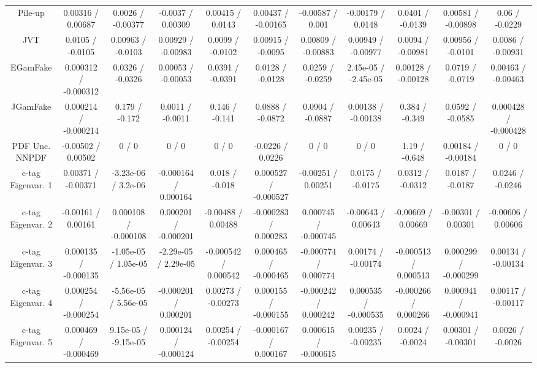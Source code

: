 \begin{table}[htbp]
\begin{center}
\begin{tabular}{|c|c|c|c|c|c|c|c|c|c|c|}
  Pile-up & 0.00316 / 0.00687 & 0.0026 / -0.00377 & -0.0037 / 0.00309 & 0.00415 / 0.0143 & 0.00437 / -0.00165 & -0.00587 / 0.001 & -0.00179 / 0.0148 & 0.0401 / -0.0139 & 0.00581 / -0.00898 & 0.06 / -0.0229 \\ 
  JVT & 0.0105 / -0.0105 & 0.00963 / -0.0103 & 0.00929 / -0.00983 & 0.0099 / -0.0102 & 0.00915 / -0.0095 & 0.00809 / -0.00883 & 0.00949 / -0.00977 & 0.0094 / -0.00981 & 0.00956 / -0.0101 & 0.0086 / -0.00931 \\ 
  EGamFake & 0.000312 / -0.000312 & 0.0326 / -0.0326 & 0.00053 / -0.00053 & 0.0391 / -0.0391 & 0.0128 / -0.0128 & 0.0259 / -0.0259 & 2.45e-05 / -2.45e-05 & 0.00128 / -0.00128 & 0.0719 / -0.0719 & 0.00463 / -0.00463 \\ 
  JGamFake & 0.000214 / -0.000214 & 0.179 / -0.172 & 0.0011 / -0.0011 & 0.146 / -0.141 & 0.0888 / -0.0872 & 0.0904 / -0.0887 & 0.00138 / -0.00138 & 0.384 / -0.349 & 0.0592 / -0.0585 & 0.000428 / -0.000428 \\ 
  PDF Unc. NNPDF & -0.00502 / 0.00502 & 0 / 0 & 0 / 0 & 0 / 0 & -0.0226 / 0.0226 & 0 / 0 & 0 / 0 & 1.19 / -0.648 & 0.00184 / -0.00184 & 0 / 0 \\ 
  c-tag Eigenvar. 1 & 0.00371 / -0.00371 & -3.23e-06 / 3.2e-06 & -0.000164 / 0.000164 & 0.018 / -0.018 & 0.000527 / -0.000527 & -0.00251 / 0.00251 & 0.0175 / -0.0175 & 0.0312 / -0.0312 & 0.0187 / -0.0187 & 0.0246 / -0.0246 \\ 
  c-tag Eigenvar. 2 & -0.00161 / 0.00161 & 0.000108 / -0.000108 & 0.000201 / -0.000201 & -0.00488 / 0.00488 & -0.000283 / 0.000283 & 0.000745 / -0.000745 & -0.00643 / 0.00643 & -0.00669 / 0.00669 & -0.00301 / 0.00301 & -0.00606 / 0.00606 \\ 
  c-tag Eigenvar. 3 & 0.000135 / -0.000135 & -1.05e-05 / 1.05e-05 & -2.29e-05 / 2.29e-05 & -0.000542 / 0.000542 & 0.000465 / -0.000465 & -0.000774 / 0.000774 & 0.00174 / -0.00174 & -0.000513 / 0.000513 & 0.000299 / -0.000299 & 0.00134 / -0.00134 \\ 
  c-tag Eigenvar. 4 & 0.000254 / -0.000254 & -5.56e-05 / 5.56e-05 & -0.000201 / 0.000201 & 0.00273 / -0.00273 & 0.000155 / -0.000155 & -0.000242 / 0.000242 & 0.000535 / -0.000535 & -0.000266 / 0.000266 & 0.000941 / -0.000941 & 0.00117 / -0.00117 \\ 
  c-tag Eigenvar. 5 & 0.000469 / -0.000469 & 9.15e-05 / -9.15e-05 & 0.000124 / -0.000124 & 0.00254 / -0.00254 & -0.000167 / 0.000167 & 0.000615 / -0.000615 & 0.00235 / -0.00235 & 0.0024 / -0.0024 & 0.00301 / -0.00301 & 0.0026 / -0.0026 \\ 

\end{tabular}
\end{center}
\end{table}
